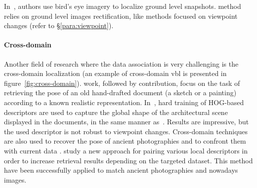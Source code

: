 			In~\citep{Bansal2011,Bansal2012,Lin2015}, authors use bird's eye imagery to localize ground level snapshots. \citet{Bansal2011} method relies on ground level images rectification, like methods focused on viewpoint changes (refer to \S\ref{para:viewpoint}).
			
		\paragraph{Cross-domain}
			\label{para:cross_domain}
			Another field of research where the data association is very challenging is the cross-domain localization (an example of cross-domain \ac{vbl} is presented in figure~\ref{fig:cross-domain}). \citet{Russell2011} work, followed by \citet{Aubry2014} contribution, focus on the task of retrieving the pose of an old hand-drafted document (a sketch or a painting) according to a known realistic representation. In~\citep{Aubry2014}, hard training of HOG-based descriptors are used to capture the global shape of the architectural scene displayed in the documents, in the same manner as~\citep{Shrivastava2011}. Results are impressive, but the used descriptor is not robust to viewpoint changes. Cross-domain techniques are also used to recover the pose of ancient photographies and to confront them with current data \citep{Bae2010,Bhowmik2017}. \citet{Bhowmik2017} study a new approach for pairing various local descriptors in order to increase retrieval results depending on the targeted dataset. This method have been successfully applied to match ancient photographies and nowadays images.
